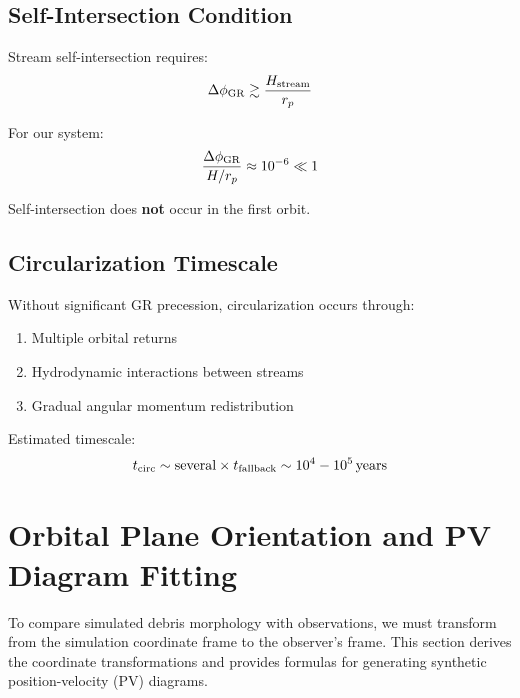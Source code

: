 \documentclass[twocolumn,amsmath,amssymb,prd,superscriptaddress,nofootinbib]{revtex4-2}
\begin{document}
\subsection{Self-Intersection Condition}
\label{sec:self_intersection}

Stream self-intersection requires:
\begin{equation}
    \Delta\phi_{\rm GR} \gtrsim \frac{H_{\rm stream}}{r_p}
    \label{eq:self_int}
\end{equation}

For our system:
\begin{equation}
    \frac{\Delta\phi_{\rm GR}}{H/r_p} \approx 10^{-6} \ll 1
\end{equation}

Self-intersection does \textbf{not} occur in the first orbit.

\subsection{Circularization Timescale}
\label{sec:t_circ}

Without significant GR precession, circularization occurs through:
\begin{enumerate}
    \item Multiple orbital returns
    \item Hydrodynamic interactions between streams
    \item Gradual angular momentum redistribution
\end{enumerate}

Estimated timescale:
\begin{equation}
    t_{\rm circ} \sim \text{several} \times t_{\rm fallback} \sim 10^4 - 10^5\,{\rm years}
    \label{eq:t_circ}
\end{equation}

\section{Orbital Plane Orientation and PV Diagram Fitting}
\label{sec:orbital_geometry}

To compare simulated debris morphology with observations, we must transform from the simulation coordinate frame to the observer's frame. This section derives the coordinate transformations and provides formulas for generating synthetic position-velocity (PV) diagrams.
\end{document}
